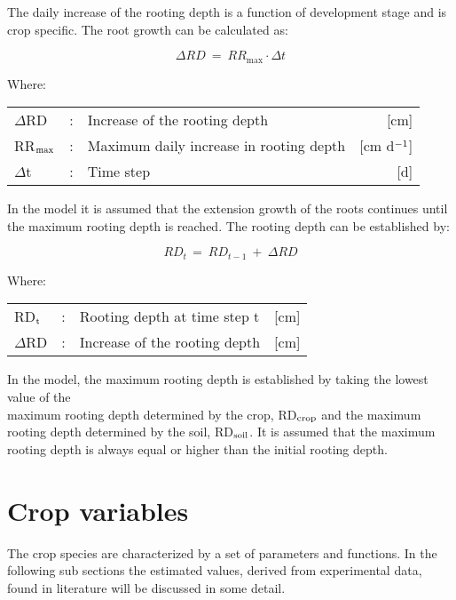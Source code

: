 The daily increase of the rooting depth is a function of development stage and is crop
specific. The root growth can be calculated as:

\begin{equation}
\Delta RD~=~RR_{\max} \cdot \Delta t
\end{equation}

Where:\\[5pt]
\begin{tabularx}{\textwidth}{llXr}
	$\Delta$RD &:& Increase of the rooting depth   &   [cm]\\
	RR$_{{\rm max}}$ &:& Maximum daily increase in rooting depth  &  [cm d$^{{\rm -}{1}}$]\\
	$\Delta$t &:& Time step   &  [d]\\
\end{tabularx}

In the model it is assumed that the extension growth of the roots continues until the
maximum rooting depth is reached. The rooting depth can be established by:

\begin{equation}
RD _{t~} =~RD _{t-1} ~+~\Delta RD
\end{equation}

Where:\\[5pt]
\begin{tabularx}{\textwidth}{llXr}
	RD$_{{\rm t}}$ &:& Rooting depth at time step t   &  [cm]\\
	$\Delta$RD &:& Increase of the rooting depth    & [cm]\\
\end{tabularx}

In the model, the maximum rooting depth is established by taking the lowest value of the\\
maximum rooting depth determined by the crop, RD$_{{\rm crop}}$ and the maximum rooting depth
determined by the soil, RD$_{{\rm soil}}$. It is assumed that the maximum rooting depth is 
always equal or higher than the initial rooting depth.


\section{Crop variables}

The crop species are characterized by a set of parameters and functions. In the following
sub sections the estimated values, derived from experimental data, found in literature will
be discussed in some detail.

